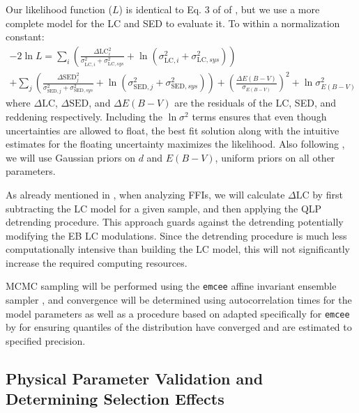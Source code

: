 Our likelihood function ($L$) is identical to Eq. 3 of of
\citep{Windemuth_et_al_19}, but we use a more complete model for the LC and SED
to evaluate it. To within a normalization constant:
%
\begin{multline*}
%
    -2 \ln L
%
    =
%
    \sum_{i} \left(
%
        \frac{ \Delta \mathrm{LC}_i^2 }{ \sigma_{\mathrm{LC},i}^2 +
        \sigma_{\mathrm{LC}, sys}^2 }
%
        +
%
        \ln\left(\sigma_{\mathrm{LC},i}^2 + \sigma_{\mathrm{LC}, sys}^2\right)
%
    \right)\\
%
    +
%
    \sum_{j} \left(
%
        \frac{ \Delta \mathrm{SED}_j^2 }{ \sigma_{\mathrm{SED},j}^2 +
        \sigma_{\mathrm{SED}, sys}^2 }
%
        +
%
        \ln\left(\sigma_{\mathrm{SED},j}^2 + \sigma_{\mathrm{SED}, sys}^2\right)
%
    \right)
%
    +
%
    \left(\frac{\Delta E(B-V)}{\sigma_{E(B-V)}}\right)^2
%
    +
%
    \ln\sigma_{E(B-V)}^2
%
\end{multline*}
%
where $\Delta \mathrm{LC}$, $\Delta \mathrm{SED}$, and $\Delta E(B-V)$ are the
residuals of the LC, SED, and reddening respectively. Including the
$\ln\sigma^2$ terms ensures that even though uncertainties are allowed to float,
the best fit solution along with the intuitive estimates for the floating
uncertainty maximizes the likelihood. Also following \citep{Windemuth_et_al_19},
we will use Gaussian priors on $d$ and $E(B-V)$, uniform priors on all other
parameters.

As already mentioned in , when analyzing FFIs, we
will calculate $\Delta \mathrm{LC}$ by first subtracting the LC model for a
given sample, and then applying the QLP detrending procedure. This approach
guards against the detrending potentially modifying the EB LC modulations. Since
the detrending procedure is much less computationally intensive than building
the LC model, this will not significantly increase the required computing
resources.

MCMC sampling will be performed using the \texttt{emcee} affine invariant
ensemble sampler \citep{Foreman-Mackey_et_al_13}, and convergence will be
determined using autocorrelation times for the model parameters as well as a
procedure based on \citep{Raftery_Lewis_91} adapted specifically for
\texttt{emcee} by \citep{Patel_Penev_22} for ensuring quantiles of the
distribution have converged and are estimated to specified precision.

\subsection{Physical Parameter Validation and Determining Selection Effects}
%
\label{sec:params_validation}

